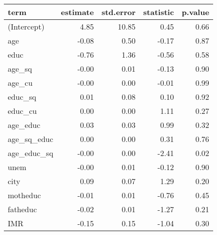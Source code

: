 \begin{tabular}{lrrrr}
  \hline
term & estimate & std.error & statistic & p.value \\ 
  \hline
(Intercept) & 4.85 & 10.85 & 0.45 & 0.66 \\ 
  age & -0.08 & 0.50 & -0.17 & 0.87 \\ 
  educ & -0.76 & 1.36 & -0.56 & 0.58 \\ 
  age\_sq & -0.00 & 0.01 & -0.13 & 0.90 \\ 
  age\_cu & -0.00 & 0.00 & -0.01 & 0.99 \\ 
  educ\_sq & 0.01 & 0.08 & 0.10 & 0.92 \\ 
  educ\_cu & 0.00 & 0.00 & 1.11 & 0.27 \\ 
  age\_educ & 0.03 & 0.03 & 0.99 & 0.32 \\ 
  age\_sq\_educ & 0.00 & 0.00 & 0.31 & 0.76 \\ 
  age\_educ\_sq & -0.00 & 0.00 & -2.41 & 0.02 \\ 
  unem & -0.00 & 0.01 & -0.12 & 0.90 \\ 
  city & 0.09 & 0.07 & 1.29 & 0.20 \\ 
  motheduc & -0.01 & 0.01 & -0.76 & 0.45 \\ 
  fatheduc & -0.02 & 0.01 & -1.27 & 0.21 \\ 
  IMR & -0.15 & 0.15 & -1.04 & 0.30 \\ 
   \hline
\end{tabular}

